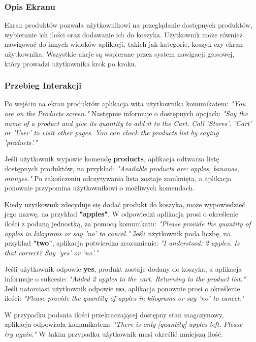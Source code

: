 \subsubsection{Opis Ekranu}
Ekran produktów pozwala użytkownikowi na przeglądanie dostępnych produktów, wybieranie ich ilości oraz dodawanie ich do koszyka. Użytkownik może również nawigować do innych widoków aplikacji, takich jak kategorie, koszyk czy ekran użytkownika. Wszystkie akcje są wspierane przez system nawigacji głosowej, który prowadzi użytkownika krok po kroku.

\subsubsection{Przebieg Interakcji}
Po wejściu na ekran produktów aplikacja wita użytkownika komunikatem: \textit{"You are on the Products screen."} Następnie informuje o dostępnych opcjach: \textit{"Say the name of a product and give its quantity to add it to the Cart. Call 'Stores', 'Cart' or 'User' to visit other pages. You can check the products list by saying 'products'."}

Jeśli użytkownik wypowie komendę \textbf{products}, aplikacja odtwarza listę dostępnych produktów, na przykład: \textit{"Available products are: apples, bananas, oranges."} Po zakończeniu odczytywania lista zostaje zamknięta, a aplikacja ponownie przypomina użytkownikowi o możliwych komendach.

Kiedy użytkownik zdecyduje się dodać produkt do koszyka, może wypowiedzieć jego nazwę, na przykład \textbf{"apples"}. W odpowiedzi aplikacja prosi o określenie ilości z podaną jednostką, za pomocą komunikatu: \textit{"Please provide the quantity of apples in kilograms or say 'no' to cancel."} Jeśli użytkownik poda liczbę, na przykład \textbf{"two"}, aplikacja potwierdza zrozumienie: \textit{"I understood: 2 apples. Is that correct? Say 'yes' or 'no'."}

Jeśli użytkownik odpowie \textbf{yes}, produkt zostaje dodany do koszyka, a aplikacja informuje o sukcesie: \textit{"Added 2 apples to the cart. Returning to the product list."} Jeśli natomiast użytkownik odpowie \textbf{no}, aplikacja ponownie prosi o określenie ilości: \textit{"Please provide the quantity of apples in kilograms or say 'no' to cancel."}

W przypadku podania ilości przekraczającej dostępny stan magazynowy, aplikacja odpowiada komunikatem: \textit{"There is only [quantity] apples left. Please try again."} W takim przypadku użytkownik musi określić mniejszą ilość.


